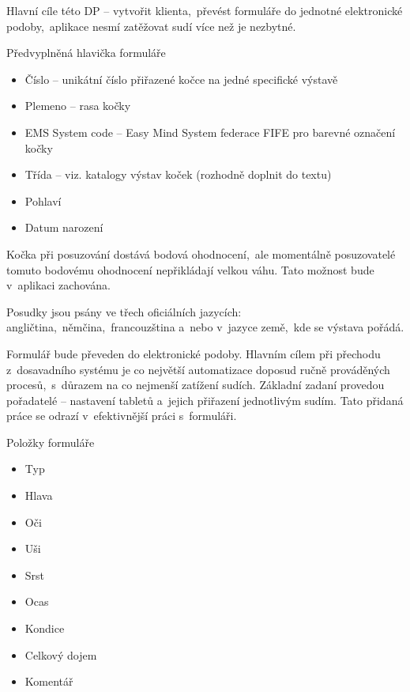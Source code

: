 \documentclass[11pt, oneside]{fithesis2}
\begin{document}
Hlavní cíle této DP -- vytvořit klienta,~převést formuláře do jednotné elektronické podoby,~aplikace nesmí zatěžovat sudí více než je nezbytné.
\linebreak


Předvyplněná hlavička formuláře
\begin{itemize}
\item Číslo -- unikátní číslo přiřazené kočce na jedné specifické výstavě
\item Plemeno -- rasa kočky
\item EMS System code -- Easy Mind System federace FIFE pro barevné označení kočky
\item Třída -- viz. katalogy výstav koček (rozhodně doplnit do textu)
\item Pohlaví
\item Datum narození
\end{itemize}

Kočka při posuzování dostává bodová ohodnocení,~ale momentálně posuzovatelé tomuto bodovému ohodnocení nepřikládají velkou váhu. Tato možnost bude v~aplikaci zachována.

Posudky jsou psány ve třech oficiálních jazycích: angličtina,~němčina,~francouzština a~nebo v~jazyce země,~kde se výstava pořádá.

Formulář bude převeden do elektronické podoby. Hlavním cílem při přechodu z~dosavadního systému je co největší automatizace doposud ručně prováděných procesů,~s~důrazem na co nejmenší zatížení sudích.
Základní zadaní provedou pořadatelé -- nastavení tabletů a~jejich přiřazení jednotlivým sudím. Tato přidaná práce se odrazí v~efektivnější práci s~formuláři.
\linebreak

Položky formuláře
\begin{itemize}
\item Typ
\item Hlava
\item Oči
\item Uši
\item Srst
\item Ocas
\item Kondice
\item Celkový dojem 
\item Komentář
\end{itemize}
\end{document}
